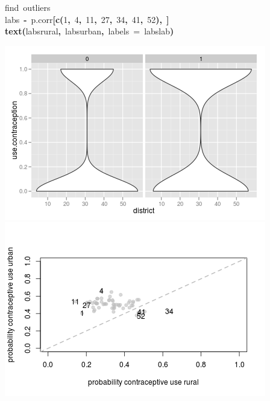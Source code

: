 \documentclass{article}
\makeatletter
\newcommand{\hlnumber}[1]{\textcolor[rgb]{0,0,0}{#1}}%
\newcommand{\hlfunctioncall}[1]{\textcolor[rgb]{.5,0,.33}{\textbf{#1}}}%
\newcommand{\hlkeyword}[1]{\textbf{#1}}%
\newcommand{\hlargument}[1]{\textcolor[rgb]{.69,.25,.02}{#1}}%
\newcommand{\hlcomment}[1]{\textcolor[rgb]{.18,.6,.34}{#1}}%
\newcommand{\hlassignement}[1]{\textbf{#1}}%
\newcommand{\hlsymbol}[1]{#1}%
\newcommand{\hlstd}[1]{\textcolor[rgb]{0,0,0}{#1}}%
\newenvironment{kframe}{%
 \def\FrameCommand##1{\hskip\@totalleftmargin \hskip-\fboxsep
 \colorbox{shadecolor}{##1}\hskip-\fboxsep
     \hskip-\linewidth \hskip-\@totalleftmargin \hskip\columnwidth}%
 \MakeFramed {\advance\hsize-\width
   \@totalleftmargin\z@ \linewidth\hsize
   \@setminipage}}%
 {\par\unskip\endMakeFramed}
\newenvironment{knitrout}{}{} %
\makeatother
\begin{document}
\begin{knitrout}
{\begin{kframe}
\begin{flushleft}
\hlstd{}\hlcomment{\usebox{\hlnormalsizeboxhash}find{\ }outliers}\hspace*{\fill}\\
\hlstd{}\hlsymbol{labs}{\ }\hlassignement{\usebox{\hlnormalsizeboxlessthan}-}{\ }\hlsymbol{p.corr}\hlkeyword{[}\hlfunctioncall{c}\hlkeyword{(}\hlnumber{1}\hlkeyword{,}{\ }\hlnumber{4}\hlkeyword{,}{\ }\hlnumber{11}\hlkeyword{,}{\ }\hlnumber{27}\hlkeyword{,}{\ }\hlnumber{34}\hlkeyword{,}{\ }\hlnumber{41}\hlkeyword{,}{\ }\hlnumber{52}\hlkeyword{)}\hlkeyword{,}{\ }\hlkeyword{]}\hspace*{\fill}\\
\hlstd{}\hlfunctioncall{text}\hlkeyword{(}\hlsymbol{labs}\hlkeyword{\usebox{\hlnormalsizeboxdollar}}\hlsymbol{rural}\hlkeyword{,}{\ }\hlsymbol{labs}\hlkeyword{\usebox{\hlnormalsizeboxdollar}}\hlsymbol{urban}\hlkeyword{,}{\ }\hlargument{labels}{\ }\hlargument{=}{\ }\hlsymbol{labs}\hlkeyword{\usebox{\hlnormalsizeboxdollar}}\hlsymbol{lab}\hlkeyword{)}\mbox{}
\normalfont
\end{flushleft}


\centering{}\includegraphics{urban-plot1} \includegraphics{urban-plot2} 

\end{kframe}}
\end{knitrout}
\end{document}
